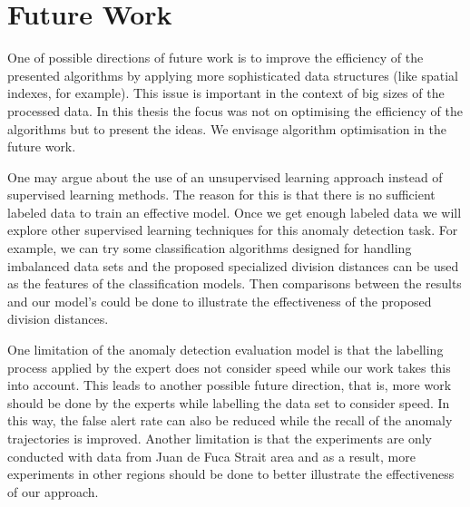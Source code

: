 \documentclass[12pt,glossary]{dalcsthesis}
\begin{document}




\section{Future Work}

One of possible directions of future work is to improve the efficiency of the presented algorithms by applying more sophisticated data structures (like spatial indexes, for example). This issue is important in the context of big sizes of the processed data. In this thesis the focus was not on optimising the efficiency of the algorithms but to present the ideas. We envisage algorithm optimisation in the future work.

One may argue about the use of an unsupervised learning approach instead of supervised learning methods. The reason for this is that there is no sufficient labeled data to train an effective model. Once we get enough labeled data we will explore other supervised learning techniques for this anomaly detection task. For example, we can try some classification algorithms designed for handling imbalanced data sets and the proposed specialized division distances can be used as the features of the classification models.  Then comparisons between the results and our model's could be done to illustrate the effectiveness of the proposed division distances.

One limitation of the  anomaly detection evaluation model is that the labelling process applied by the expert does not consider speed while our work takes this into account. This leads to another possible future direction, that is, more work should be done by the experts while labelling the data set to consider speed. In this way, the false alert rate can also be reduced while the recall of the anomaly trajectories is improved. Another limitation is that the experiments are only conducted with data from Juan de Fuca Strait area and as a result, more experiments in other regions should be done to better illustrate the effectiveness of our approach.
\end{document}
